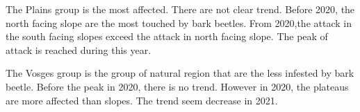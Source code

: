 \documentclass[3p,procedia]{elsarticle}
\begin{document}
The Plains group is the most affected. 
There are not clear trend. Before 2020, the north facing slope are the most touched by bark beetles.
From 2020,the attack in the south facing slopes exceed the attack in north facing slope. 
The peak of attack is reached during this year.

The Vosges group is the group of natural region that are the less infested by bark beetle. 
Before the peak in 2020, there is no trend. However in 2020, the plateaus are more affected than slopes.
The trend seem decrease in 2021.
  

 
 
\end{document}
